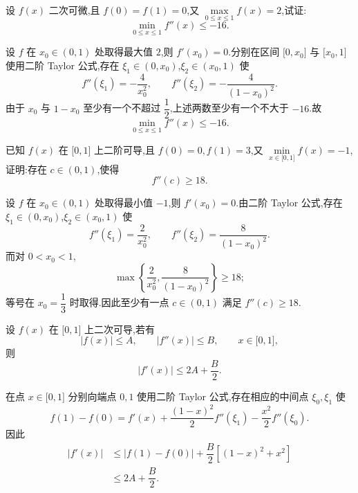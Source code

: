 \begin{example}
    设 $f(x)$ 二次可微,且 $f(0)=f(1)=0$,又
    $\displaystyle\max\limits_{0\leq x\leq1}f(x)=2$,试证:
    \[
        \min\limits_{0\leq x\leq1}f''(x)\leq-16.
    \]
\end{example}
\exampleblank

\begin{solution}
    设 $f$ 在 $x_0\in(0,1)$ 处取得最大值 $2$,则 $f'(x_0)=0$.分别在区间 $\lbrack0,x_0\rbrack$ 与 $\lbrack x_0,1\rbrack$ 使用二阶 Taylor 公式,存在 $\xi_1\in(0,x_0)$,$\xi_2\in(x_0,1)$ 使
    \[
        f''(\xi_1)=-\dfrac{4}{x_0^2},
        \qquad
        f''(\xi_2)=-\dfrac{4}{(1-x_0)^2}.
    \]
    由于 $x_0$ 与 $1-x_0$ 至少有一个不超过 $\dfrac{1}{2}$,上述两数至少有一个不大于 $-16$.故
    \[
        \min\limits_{0\leq x\leq1}f''(x)\leq-16.
    \]
\end{solution}

\begin{example}
    已知 $f(x)$ 在 $\lbrack 0,1\rbrack$ 上二阶可导,且 $f(0)=0,f(1)=3$,又
    $\displaystyle\min\limits_{x\in\lbrack 0,1\rbrack}f(x)=-1$,证明:存在 $c\in(0,1)$,使得
    \[
        f''(c)\geq18.
    \]
\end{example}
\exampleblank

\begin{solution}
    设 $f$ 在 $x_0\in(0,1)$ 处取得最小值 $-1$,则 $f'(x_0)=0$.由二阶 Taylor 公式,存在 $\xi_1\in(0,x_0)$,$\xi_2\in(x_0,1)$ 使
    \[
        f''(\xi_1)=\dfrac{2}{x_0^2},
        \qquad
        f''(\xi_2)=\dfrac{8}{(1-x_0)^2}.
    \]
    而对 $0<x_0<1$,
    \[
        \max\left\{\dfrac{2}{x_0^2},\dfrac{8}{(1-x_0)^2}\right\}\geq18;
    \]
    等号在 $x_0=\dfrac{1}{3}$ 时取得.因此至少有一点 $c\in(0,1)$ 满足 $f''(c)\geq18$.
\end{solution}

\begin{example}[\markstar]
    设 $f(x)$ 在 $\lbrack 0,1\rbrack$ 上二次可导,若有
    \[
        |f(x)|\leq A,\qquad |f''(x)|\leq B,\qquad x\in\lbrack 0,1\rbrack,
    \]
    则
    \[
        |f'(x)|\leq2A+\dfrac{B}{2}.
    \]
\end{example}
\exampleblank

\begin{solution}
    在点 $x\in\lbrack0,1\rbrack$ 分别向端点 $0,1$ 使用二阶 Taylor 公式,存在相应的中间点 $\xi_0,\xi_1$ 使
    \[
        f(1)-f(0)
        =f'(x)+\dfrac{(1-x)^2}{2}f''(\xi_1)
        -\dfrac{x^2}{2}f''(\xi_0).
    \]
    因此
    \[
        \begin{aligned}
            |f'(x)|
             & \leq |f(1)-f(0)|
            +\dfrac{B}{2}\left[(1-x)^2+x^2\right] \\
             & \leq2A+\dfrac{B}{2}.
        \end{aligned}
    \]
\end{solution}

